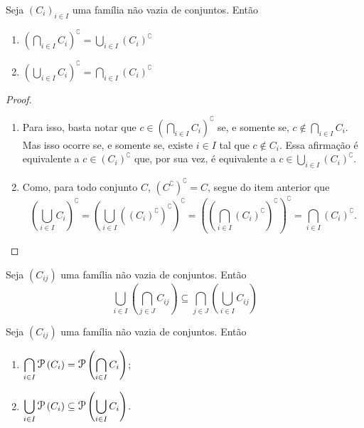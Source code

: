\begin{prop}
Seja $(C_i)_{i \in I}$ uma família não vazia de conjuntos. Então
	\begin{enumerate}
	\item $\displaystyle \left( \bigcap_{i \in I} C_i \right)^\complement = \bigcup_{i \in I} (C_i)^\complement$
	
	\item $\displaystyle \left( \bigcup_{i \in I} C_i \right)^\complement = \bigcap_{i \in I} (C_i)^\complement$
	\end{enumerate}
\end{prop}
\begin{proof}
	\begin{enumerate}
	\item Para isso, basta notar que $c \in \left( \bigcap_{i \in I} C_i \right)^\complement$ se, e somente se, $c \notin \bigcap_{i \in I} C_i$. Mas isso ocorre se, e somente se, existe $i \in I$ tal que $c \notin C_i$. Essa afirmação é equivalente a $c \in (C_i)^\complement$ que, por sua vez, é equivalente a $ c \in \bigcup_{i \in I} (C_i)^\complement$.
	
		\item Como, para todo conjunto $C$, $(C^\complement)^\complement = C$, segue do item anterior que
		\begin{equation*}
		\displaystyle \left( \bigcup_{i \in I} C_i \right)^\complement = \left( \bigcup_{i \in I} ((C_i)^\complement)^\complement \right)^\complement = \left( \left( \bigcap_{i \in I} (C_i)^\complement \right)^\complement \right)^\complement = \bigcap_{i \in I} (C_i)^\complement.
		\end{equation*}
	\end{enumerate}
\end{proof}

\begin{prop}
Seja $(C_{ij})$ uma família não vazia de conjuntos. Então
	\begin{equation*}
	\bigcup_{i \in I} \left( \bigcap_{j \in J} C_{ij} \right) \subseteq \bigcap_{j \in J} \left( \bigcup_{i \in I} C_{ij} \right)
	\end{equation*}
\end{prop}

\begin{prop}
Seja $(C_{ij})$ uma família não vazia de conjuntos. Então
	\begin{enumerate}
	\item $\displaystyle\bigcap_{i \in I} \p\left(C_i \right) = \p\left(\displaystyle\bigcap_{i \in I} C_i \right)$;
	\item $\displaystyle\bigcup_{i \in I} \p\left(C_i \right) \subseteq \p\left(\displaystyle\bigcup_{i \in I} C_i \right)$.
	\end{enumerate}
\end{prop}




